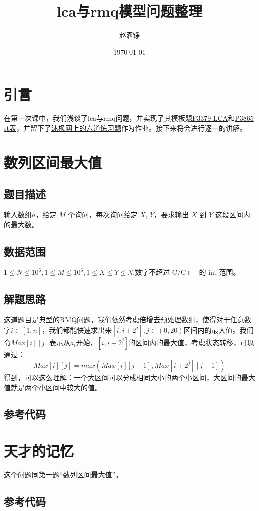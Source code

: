 \documentclass[UTF8]{ctexart}
\title{lca与rmq模型问题整理}
\author{赵涵铮}
\date{\today}
\begin{document}
	\maketitle
	
	\section{引言}
	在第一次课中，我们浅谈了lca与rmq问题，并实现了其模板题\href{https://www.luogu.com.cn/problem/P3379}{P3379 LCA}和\href{https://www.luogu.com.cn/problem/P3865}{P3865 st表}，并留下了\href{https://www.mfstem.org/homework/63e64885b2e20e03a62838e3}{沐枫网上的六道练习题}作为作业。接下来将会进行逐一的讲解。
	
	\section{数列区间最大值}
	\subsection{题目描述}
	输入数组$a$，给定 $M$ 个询问，每次询问给定 $X$, $Y$，要求输出 $X$ 到 $Y$ 这段区间内的最大数。
	\subsection{数据范围}
	$1\leq N\leq 10^6,1\leq M\leq 10^6,1\leq X \leq Y\leq N$,数字不超过 C/C++ 的 int 范围。
	\subsection{解题思路}
	这道题目是典型的RMQ问题，我们依然考虑倍增去预处理数组，使得对于任意数字$i \in [1,n]$，我们都能快速求出来$[i,i+2^j],j\in (0,20)$区间内的最大值。我们令$Max[i][j]$表示从$a_i$开始，$[i,i+2^j]$的区间内的最大值，考虑状态转移，可以通过：
	$$
	Max[i][j] = max(Max[i][j-1],Max[i+2^j][j-1])
	$$
	得到，可以这么理解：一个大区间可以分成相同大小的两个小区间，大区间的最大值就是两个小区间中较大的值。
	\subsection{参考代码}
	
	
	\section{天才的记忆}
	这个问题同第一题“数列区间最大值”。
	\subsection{参考代码}
	
\end{document}

